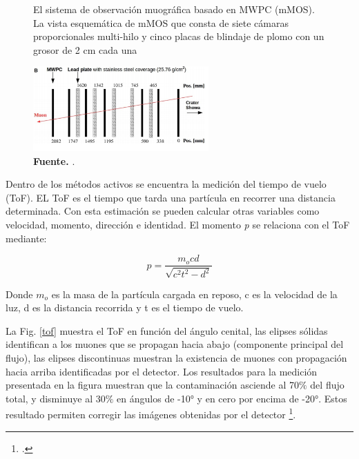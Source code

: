   
  \begin{figure}[H]
    \begin{center}
        \caption{El sistema de observación muográfica basado en MWPC (mMOS). La vista esquemática de mMOS que consta de siete cámaras proporcionales multi-hilo y cinco placas de blindaje de plomo con un grosor de 2 cm cada una }
        \includegraphics[width=0.6\textwidth]{Figures/imagenes/multi.png}
        \caption*{\textbf{Fuente.} \cite{Olh2018}. }
        \label{multi}
    \end{center}
\end{figure}
Dentro de los métodos activos se encuentra la medición del tiempo de vuelo (ToF). EL ToF es el tiempo que tarda una partícula en recorrer una distancia determinada. Con esta  estimación se pueden calcular otras variables como velocidad, momento, dirección e identidad. 
El momento \textit{p} se relaciona con el ToF mediante:

\begin{equation}
    p= \frac{m_ocd}{\sqrt{c^2t^2-d^2}}
\label{MOM}
\end{equation}

Donde $m_o$ es la masa de la partícula cargada en reposo, c es la velocidad de la luz, d es la distancia recorrida y t es el tiempo de vuelo. 


La Fig. \ref{tof} muestra el ToF en función del ángulo cenital, las elipses sólidas identifican a los muones que se propagan hacia abajo (componente principal del flujo), las elipses discontinuas muestran la existencia de muones con propagación hacia arriba identificadas por el detector. Los resultados para la medición presentada en la figura muestran que la contaminación asciende al 70$\%$ del flujo total, y disminuye al 30$\%$ en ángulos de -10° y en cero por encima de -20°. Estos resultado permiten corregir las imágenes obtenidas por el detector \footcite{Marteau2014}.


